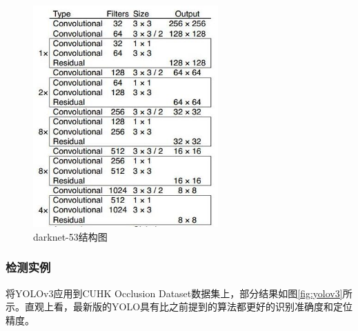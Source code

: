 \documentclass[12pt,a4paper,titlepage]{article}
\begin{document}
\begin{figure}[h]
\centering
\includegraphics[height=8.5cm]{img/darknet53.jpg}
\caption{darknet-53结构图}
\label{fig:darknet53}
\end{figure}

\subsubsection{检测实例}
将YOLOv3应用到CUHK Occlusion Dataset数据集上，部分结果如图\ref{fig:yolov3}所示。直观上看，最新版的YOLO具有比之前提到的算法都更好的识别准确度和定位精度。
\end{document}
